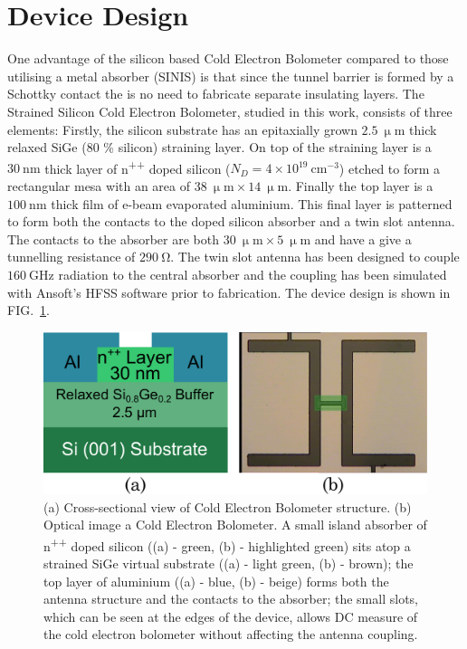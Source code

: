 \documentclass[aip, apl, a4paper, amsmath,amssymb, reprint]{revtex4-1}
\begin{document}
\section{Device Design} \label{sec:Device}

One advantage of the silicon based Cold Electron Bolometer compared to those utilising a metal absorber (SINIS) is that since the tunnel barrier is formed by a Schottky contact the is no need to fabricate separate insulating layers. The Strained Silicon Cold Electron Bolometer, studied in this work, consists of three elements: Firstly, the silicon substrate has an epitaxially grown $2.5~\mathrm{\upmu m}$ thick relaxed SiGe (80 \% silicon) straining layer.  On top of the straining layer is a $30~\mathrm{nm}$ thick layer of n\textsuperscript{++} doped silicon ($N_{D} = 4 \times 10^{19}~\mathrm{cm}^{-3}$) etched to form a rectangular mesa with an area of $38~\mathrm{\upmu m} \times 14~\mathrm{\upmu m}$. Finally the top layer is a $100~\mathrm{nm}$ thick film of e-beam evaporated aluminium. This final layer is patterned to form both the contacts to the doped silicon absorber and a twin slot antenna. The contacts to the absorber are both $30~\mathrm{\upmu m} \times 5~\mathrm{\upmu m}$ and have a give a tunnelling resistance of $290~\mathrm{\Omega}$. The twin slot antenna has been designed to couple $160~\mathrm{GHz}$ radiation to the central absorber and the coupling has been simulated with Ansoft's HFSS software prior to fabrication. The device design is shown in FIG.~\ref{fig:device_design}.
\begin{figure}[ht]
\includegraphics[width = 0.8\columnwidth]{CEB_structure_strained_APL}
\caption{(a) Cross-sectional view of Cold Electron Bolometer structure. (b) Optical image a Cold Electron Bolometer. A small island absorber of n\textsuperscript{++} doped silicon ((a) - green, (b) - highlighted green) sits atop a strained SiGe virtual substrate ((a) - light green, (b) - brown); the top layer of aluminium ((a) - blue, (b) - beige) forms both the antenna structure and the contacts to the absorber; the small slots, which can be seen at the edges of the device, allows DC measure of the cold electron bolometer without affecting the antenna coupling.}\label{fig:device_design}
\end{figure}
\end{document}
